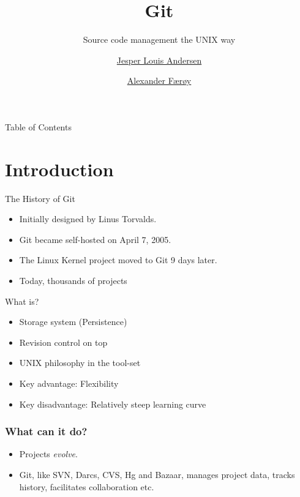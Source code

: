 \documentclass[xcolor=pdftex,dvipsnames]{beamer}
\title{Git}
\subtitle{Source code management the UNIX way}
\author{\href{mailto:jesper.louis.andersen@gmail.com}{Jesper Louis Andersen}
        \and
        \href{mailto:ahf@0x90.dk}{Alexander Færøy}}
\begin{document}
\frame{\titlepage}

\begin{frame}{Table of Contents}
    \tableofcontents
\end{frame}

\section{Introduction}
\begin{frame}{The History of Git}
    \begin{itemize}
        \item Initially designed by Linus Torvalds.
        \item Git became self-hosted on April 7, 2005.
        \item The Linux Kernel project moved to Git 9 days later.
        \item Today, thousands of projects
    \end{itemize}
\end{frame}
\begin{frame}{What is?}
  \begin{itemize}
  \item Storage system (Persistence)
  \item Revision control on top
  \item UNIX philosophy in the tool-set
  \item Key advantage: Flexibility
  \item Key disadvantage: Relatively steep learning curve
  \end{itemize}
\end{frame}
\begin{frame}
  \frametitle{What can it do?}
  \begin{itemize}
  \item Projects \emph{evolve}.
  \item Git, like SVN, Darcs, CVS, Hg and Bazaar, manages project
    data, tracks history, facilitates collaboration etc.
  \end{itemize}
\end{frame}
\end{document}
